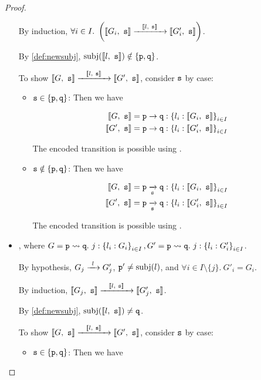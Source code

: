 \begin{proof}
\begin{itemize}
By induction, 
$\forall i \in I. ~ \left(
\treducelong{\enc{G_i}{s}}{\enc{G'_i}{s}}{\enc{l}{s}}
\right)$.

By \cref{def:newsubj}, 
$\subj{\enc{l}{s}} \notin \{ \mrole{p}, \mrole{q} \}$.

To show $\treducelong
{\enc{G}{s}}{\enc{G'}{s}}{\enc{l}{s}}$,
consider $\mrole{s}$ by case:

\begin{itemize}

\item $\mrole{s} \in \{ \mrole{p}, \mrole{q} \}$:
Then we have

\begin{align*}
\enc{G}{s} &= \gcomm{p}{q}{l_i: \enc{G_i}{s}}{i \in I} \\
\enc{G'}{s} &= \gcomm{p}{q}{l_i: \enc{G'_i}{s}}{i \in I} \\
\end{align*}

The encoded transition is possible using .

\item $\mrole{s} \notin \{ \mrole{p}, \mrole{q} \}$:
Then we have

\begin{align*}
\enc{G}{s} &= \groute{p}{q}{s}{l_i: \enc{G_i}{s}}{i \in I} \\
\enc{G'}{s} &= \groute{p}{q}{s}{l_i: \enc{G'_i}{s}}{i \in I} \\
\end{align*}

The encoded transition is possible using .

\end{itemize}

\item {},
where $G = \gtrans{p}{q}{j}{l_i: G_i}{i \in I},
G' = \gtrans{p}{q}{j}{l_i: G'_i}{i \in I}$.

By hypothesis,
$\treduce{G_j}{G'_j}{l}$,
$\mrole{p'} \neq \subj{l}$,
and $\forall i \in I \setminus \{j\}. ~ G'_i = G_i$.

By induction, 
$\treducelong{\enc{G_j}{s}}{\enc{G'_j}{s}}{\enc{l}{s}}$.

By \cref{def:newsubj}, 
$\subj{\enc{l}{s}} \neq \mrole{q}$.

To show $\treducelong
{\enc{G}{s}}{\enc{G'}{s}}{\enc{l}{s}}$,
consider $\mrole{s}$ by case:

\begin{itemize}

\item $\mrole{s} \in \{ \mrole{p}, \mrole{q} \}$:
Then we have


\end{itemize}
\end{itemize}
\end{proof}
